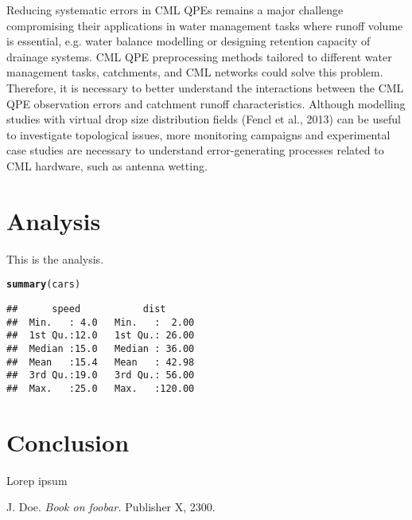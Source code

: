 \documentclass{ctuthesis}\usepackage[]{graphicx}\usepackage[]{color}
\makeatletter
\newcommand{\hlstd}[1]{\textcolor[rgb]{0.345,0.345,0.345}{#1}}%
\newcommand{\hlkwd}[1]{\textcolor[rgb]{0.737,0.353,0.396}{\textbf{#1}}}%
\newenvironment{kframe}{%
 \def\at@end@of@kframe{}%
 \ifinner\ifhmode%
  \def\at@end@of@kframe{\end{minipage}}%
  \begin{minipage}{\columnwidth}%
 \fi\fi%
 \def\FrameCommand##1{\hskip\@totalleftmargin \hskip-\fboxsep
 \colorbox{shadecolor}{##1}\hskip-\fboxsep
     \hskip-\linewidth \hskip-\@totalleftmargin \hskip\columnwidth}%
 \MakeFramed {\advance\hsize-\width
   \@totalleftmargin\z@ \linewidth\hsize
   \@setminipage}}%
 {\par\unskip\endMakeFramed%
 \at@end@of@kframe}
\newenvironment{knitrout}{}{} %
\makeatother
\begin{document}
Reducing systematic errors in CML QPEs remains a major challenge compromising their applications in water management tasks where runoff volume is essential, e.g. water balance modelling or designing retention capacity of drainage systems. CML QPE preprocessing methods tailored to different water management tasks, catchments, and CML networks could solve this problem. Therefore, it is necessary to better understand the interactions between the CML QPE observation errors and catchment runoff characteristics. Although modelling studies with virtual drop size distribution fields (Fencl et al., 2013) can be useful to investigate topological issues, more monitoring campaigns and experimental case studies are necessary to understand error-generating processes related to CML hardware, such as antenna wetting.





        


\chapter{Analysis}
This is the analysis.

\begin{knitrout}
\color{fgcolor}\begin{kframe}
\begin{alltt}
\hlkwd{summary}\hlstd{(cars)}
\end{alltt}
\begin{verbatim}
##      speed           dist       
##  Min.   : 4.0   Min.   :  2.00  
##  1st Qu.:12.0   1st Qu.: 26.00  
##  Median :15.0   Median : 36.00  
##  Mean   :15.4   Mean   : 42.98  
##  3rd Qu.:19.0   3rd Qu.: 56.00  
##  Max.   :25.0   Max.   :120.00
\end{verbatim}
\end{kframe}
\end{knitrout}
        
        
        
        \chapter{Conclusion}
        Lorep ipsum \cite{doe}
        
        
        \begin{thebibliography}{1}
         J. Doe. \emph{Book on foobar.} Publisher X, 2300.
        \end{thebibliography}
        
    
\end{document}
